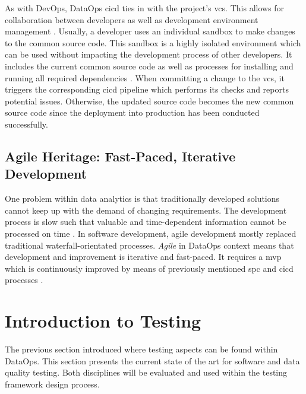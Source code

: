 As with DevOps, DataOps \ac{cicd} ties in with the project's \acf{vcs}. This allows for collaboration between developers as well as development environment management \cite{Davis2020}. Usually, a developer uses an individual sandbox to make changes to the common source code. This sandbox is a highly isolated environment which can be used without impacting the development process of other developers. It includes the current common source code as well as processes for installing and running all required dependencies \cite[41]{Bergh2019}. When committing a change to the \ac{vcs}, it triggers the corresponding \ac{cicd} pipeline which performs its checks and reports potential issues. Otherwise, the updated source code becomes the new common source code since the deployment into production has been conducted successfully.

\subsection{Agile Heritage: Fast-Paced, Iterative Development}
One problem within data analytics is that traditionally developed solutions cannot keep up with the demand of changing requirements. The development process is slow such that valuable and time-dependent information cannot be processed on time \cite{Lockner2019}. In software development, agile development mostly replaced traditional waterfall-orientated processes. \textit{Agile} in DataOps context means that development and improvement is iterative and fast-paced. It requires a \ac{mvp} which is continuously improved by means of previously mentioned \ac{spc} and \ac{cicd} processes \cite[19\psq]{Bergh2019}.

\section{Introduction to Testing}
The previous section introduced where testing aspects can be found within DataOps. This section presents the current state of the art for software and data quality testing. Both disciplines will be evaluated and used within the testing framework design process.

